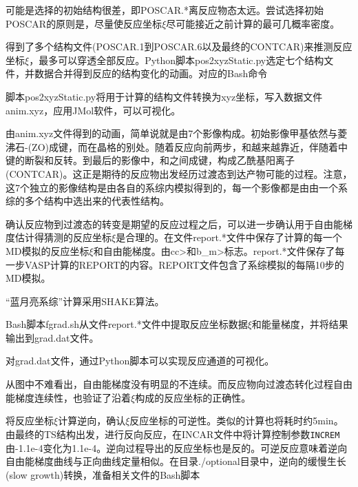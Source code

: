 可能是选择的初始结构很差，即\textrm{POSCAR.*}离反应物态太远。尝试选择初始\textrm{POSCAR}的原则是，尽量使反应坐标$\xi$尽可能接近之前计算的最可几概率密度。

得到了多个结构文件(\textrm{POSCAR.1}到\textrm{POSCAR.6}以及最终的\textrm{CONTCAR})来推测反应坐标$\xi$，最多可以穿透全部反应。\textrm{Python}脚本\textrm{pos2xyzStatic.py}选定七个结构文件，并数据合并得到反应的结构变化的动画。对应的\textrm{Bash}命令

脚本\textrm{pos2xyzStatic.py}将用于计算的结构文件转换为\textrm{xyz}坐标，写入数据文件\textrm{anim.xyz}，应用\textrm{JMol}软件，可以可视化。

由\textrm{anim.xyz}文件得到的动画，简单说就是由7个影像构成。初始影像甲基依然与菱沸石-\textrm{(ZO)}成键，而在晶格的别处。随着反应向前两步，和越来越靠近，伴随着中键的断裂和反转。到最后的影像中，和之间成键，构成乙酰基阳离子\textrm{(CONTCAR)}。这正是期待的反应物出发经历过渡态到达产物可能的过程。注意，这7个独立的影像结构是由各自的系综内模拟得到的，每一个影像都是由由一个系综的多个结构中选出来的代表性结构。

确认反应物到过渡态的转变是期望的反应过程之后，可以进一步确认用于自由能梯度估计得猜测的反应坐标$\xi$是合理的。在文件\textrm{report.*}文件中保存了计算的每一个\textrm{MD}模拟的反应坐标$\xi$和自由能梯度。由\textrm{cc>}和\textrm{b\_m>}标志。\textrm{report.*}文件保存了每一步\textrm{VASP}计算的\textrm{REPORT}的内容。\textrm{REPORT}文件包含了系综模拟的每隔10步的\textrm{MD}模拟。

``蓝月亮系综''计算采用\textrm{SHAKE}算法。

\textrm{Bash}脚本\textrm{fgrad.sh}从文件\textrm{report.*}文件中提取反应坐标数据$\xi$和能量梯度，并将结果输出到\textrm{grad.dat}文件。

对\textrm{grad.dat}文件，通过\textrm{Python}脚本可以实现反应通道的可视化。

从图中不难看出，自由能梯度没有明显的不连续。而反应物向过渡态转化过程自由能梯度连续性，也验证了沿着$\xi$构成的反应坐标的正确性。%

将反应坐标$\xi$计算逆向，确认$\xi$反应坐标的可逆性。类似的计算也将耗时约\textrm{5min}。由最终的\textrm{TS}结构出发，进行反向反应，在\textrm{INCAR}文件中将计算控制参数\texttt{INCREM}由\textrm{-1.1e-4}变化为\textrm{1.1e-4}。逆向过程导出的反应坐标也是反的。可逆反应意味着逆向自由能梯度曲线与正向曲线定量相似。在目录\textrm{./optional}目录中，逆向的缓慢生长\textrm{(slow growth)}转换，准备相关文件的\textrm{Bash}脚本

